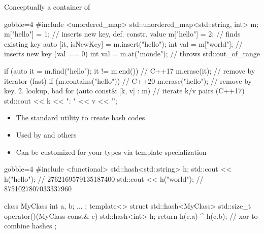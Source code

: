 \begin{frame}[fragile]
    \begin{block}{}
        Conceptually a container of 
    \end{block}
    \begin{cppcode*}{gobble=4}
        #include <unordered_map>
        std::unordered_map<std::string, int> m;
        m["hello"] = 1;  // inserts new key, def. constr. value
        m["hello"] = 2;  // finds existing key
        auto [it, isNewKey] = m.insert("hello");
        int val = m["world"];    // inserts new key (val == 0)
        int val = m.at("monde"); // throws std::out_of_range

        if (auto it = m.find("hello"); it != m.end()) // C++17
            m.erase(it);      // remove by iterator (fast)
        if (m.contains("hello")) // C++20
            m.erase("hello"); // remove by key, 2. lookup, bad
        for (auto const& [k, v] : m) // iterate k/v pairs (C++17)
            std::cout << k << ": " << v << '\n';
    \end{cppcode*}
\end{frame}

\begin{frame}[fragile]
    \begin{block}{}
        \begin{itemize}
            \item The standard utility to create hash codes
            \item Used by  and others
            \item Can be customized for your types via template specialization
        \end{itemize}
    \end{block}
    \begin{cppcode*}{gobble=4}
        #include <functional>
        std::hash<std::string> h;
        std::cout << h("hello"); // 2762169579135187400
        std::cout << h("world"); // 8751027807033337960

        class MyClass { int a, b; ... };
        template<> struct std::hash<MyClass> {
          std::size_t operator()(MyClass const& c) {
            std::hash<int> h;
            return h(c.a) ^ h(c.b); // xor to combine hashes
          }
        };
    \end{cppcode*}
\end{frame}

